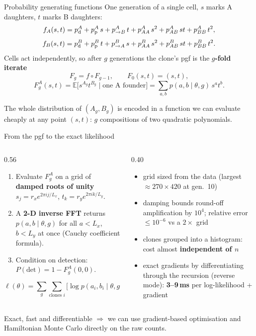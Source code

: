 \documentclass[aspectratio=169,11pt]{beamer}
\newcommand{\take}[1]{\begin{block}{}\small #1\end{block}}
\begin{document}
\begin{frame}{Probability generating functions}
One generation of a single cell, $s$ marks A daughters, $t$ marks B daughters:
\[
f_A(s,t) = p^A_{\rm d} + p^A_{\rm p}\,s + p^A_{\to B}\,t + p^A_{AA}\,s^2 + p^A_{AB}\,st + p^A_{BB}\,t^2,
\]
\[
f_B(s,t) = p^B_{\rm d} + p^B_{\rm p}\,t + p^B_{\to A}\,s + p^B_{AA}\,s^2 + p^B_{AB}\,st + p^B_{BB}\,t^2.
\]
Cells act independently, so after $g$ generations the clone's pgf is the \textbf{$g$-fold iterate}
\[
F_g = f \circ F_{g-1},\qquad F_0(s,t) = (s,t),
\]
\[
F^A_g(s,t) = \mathbb E\big[s^{A_g}t^{B_g}\mid \text{one A founder}\big] = \sum_{a,b} p(a,b\mid\theta,g)\, s^a t^b .
\]
\take{The whole distribution of $(A_g, B_g)$ is encoded in a function we can evaluate cheaply at any point $(s,t)$: $g$ compositions of two quadratic polynomials.}
\end{frame}

\begin{frame}{From the pgf to the exact likelihood}
\begin{columns}[T]
\begin{column}{0.56\textwidth}
\begin{enumerate}
\item Evaluate $F^A_g$ on a grid of \textbf{damped roots of unity}\\ $s_j = r_x e^{2\pi i j/L_x}$, $t_k = r_y e^{2\pi i k/L_y}$.
\item A \textbf{2-D inverse FFT} returns $p(a,b\mid\theta,g)$ for all $a<L_x$, $b<L_y$ at once (Cauchy coefficient formula).
\item Condition on detection: $P(\text{det}) = 1 - F^A_g(0,0)$.
\end{enumerate}
\[
\ell(\theta) = \sum_{g}\sum_{\text{clones } i}\Big[\log p(a_i,b_i\mid\theta,g) - \log P(\text{det}\mid\theta,g)\Big]
\]
\end{column}
\begin{column}{0.40\textwidth}\small
\begin{itemize}
\item grid sized from the data (largest $\approx 270\times420$ at gen.\ 10)
\item damping bounds round-off amplification by $10^4$; relative error $\le 10^{-6}$ vs a $2\times$ grid
\item clones grouped into a histogram: cost almost \textbf{independent of $n$}
\item exact gradients by differentiating through the recursion (reverse mode): \textbf{3--9\,ms} per log-likelihood + gradient
\end{itemize}
\end{column}
\end{columns}
\take{Exact, fast and differentiable $\Rightarrow$ we can use gradient-based optimisation and Hamiltonian Monte Carlo directly on the raw counts.}
\end{frame}
\end{document}
